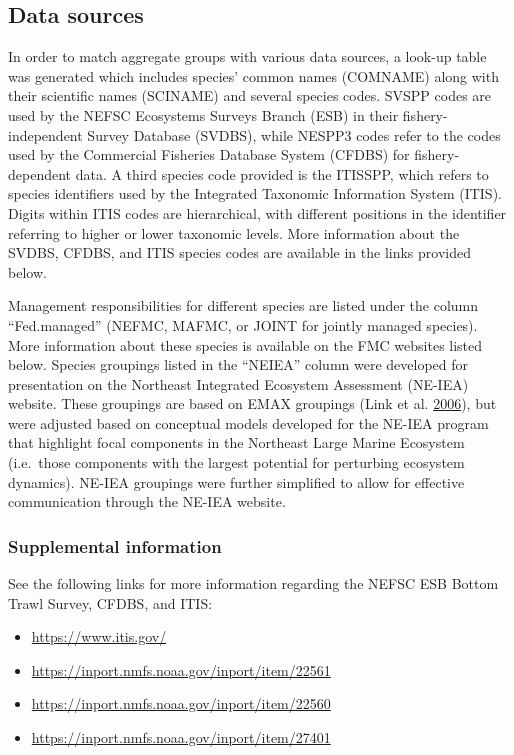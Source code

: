 \documentclass[
]{book}
\providecommand{\tightlist}{%
  \setlength{\itemsep}{0pt}\setlength{\parskip}{0pt}}
\begin{document}
\hypertarget{data-sources}{%
\subsection{Data sources}\label{data-sources}}

In order to match aggregate groups with various data sources, a look-up table was generated which includes species' common names (COMNAME) along with their scientific names (SCINAME) and several species codes. SVSPP codes are used by the NEFSC Ecosystems Surveys Branch (ESB) in their fishery-independent Survey Database (SVDBS), while NESPP3 codes refer to the codes used by the Commercial Fisheries Database System (CFDBS) for fishery-dependent data. A third species code provided is the ITISSPP, which refers to species identifiers used by the Integrated Taxonomic Information System (ITIS). Digits within ITIS codes are hierarchical, with different positions in the identifier referring to higher or lower taxonomic levels. More information about the SVDBS, CFDBS, and ITIS species codes are available in the links provided below.

Management responsibilities for different species are listed under the column ``Fed.managed'' (NEFMC, MAFMC, or JOINT for jointly managed species). More information about these species is available on the FMC websites listed below. Species groupings listed in the ``NEIEA'' column were developed for presentation on the Northeast Integrated Ecosystem Assessment (NE-IEA) website. These groupings are based on EMAX groupings (Link et al. \protect\hyperlink{ref-link2006EMAX}{2006}), but were adjusted based on conceptual models developed for the NE-IEA program that highlight focal components in the Northeast Large Marine Ecosystem (i.e.~those components with the largest potential for perturbing ecosystem dynamics). NE-IEA groupings were further simplified to allow for effective communication through the NE-IEA website.

\hypertarget{supplemental-information}{%
\subsubsection{Supplemental information}\label{supplemental-information}}

See the following links for more information regarding the NEFSC ESB Bottom Trawl Survey, CFDBS, and ITIS:

\begin{itemize}
\tightlist
\item
  \url{https://www.itis.gov/}~\\
\item
  \url{https://inport.nmfs.noaa.gov/inport/item/22561}~\\
\item
  \url{https://inport.nmfs.noaa.gov/inport/item/22560}~\\
\item
  \url{https://inport.nmfs.noaa.gov/inport/item/27401}
\end{itemize}
\end{document}
